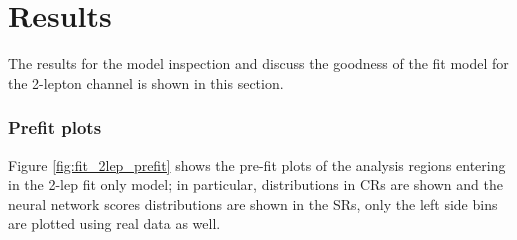 \chapter{Results}

The results for the model inspection and discuss the goodness of the fit model for the 2-lepton channel is shown in this section.

\subsection{Prefit plots}

Figure \ref{fig:fit_2lep_prefit} shows the pre-fit plots of the analysis regions entering in the 2-lep fit only model;
in particular, \mjjtag distributions in \Zjets CRs are shown and the neural network scores distributions are shown in the SRs, only the left side bins are plotted using real data as well.

